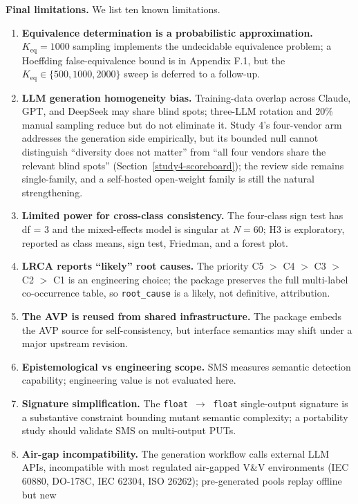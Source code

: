 \documentclass[manuscript,screen,review]{acmart}
\begin{document}
\textbf{Final limitations.} We list ten known limitations.

\begin{enumerate}
\item
  \textbf{Equivalence determination is a probabilistic approximation.}
  $K_{\mathrm{eq}} = 1000$ sampling implements the undecidable equivalence
  problem; a Hoeffding false-equivalence bound is in Appendix F.1, but the
  $K_{\mathrm{eq}} \in \{500, 1000, 2000\}$ sweep is deferred to a follow-up.
\item
  \textbf{LLM generation homogeneity bias.} Training-data overlap across Claude,
  GPT, and DeepSeek may share blind spots; three-LLM rotation and 20\% manual
  sampling reduce but do not eliminate it. Study 4's four-vendor arm
  addresses the generation side empirically, but its bounded null cannot
  distinguish ``diversity does not matter'' from ``all four vendors share the
  relevant blind spots'' (Section~\ref{study4-scoreboard}); the review side
  remains single-family, and a self-hosted open-weight family is still the
  natural strengthening.
\item
  \textbf{Limited power for cross-class consistency.} The four-class sign test
  has df = 3 and the mixed-effects model is singular at $N = 60$; H3 is
  exploratory, reported as class means, sign test, Friedman, and a forest plot.
\item
  \textbf{LRCA reports ``likely'' root causes.} The priority
  C5 $>$ C4 $>$ C3 $>$ C2 $>$ C1 is an engineering choice; the package preserves
  the full multi-label co-occurrence table, so \texttt{root\_cause} is a likely,
  not definitive, attribution.
\item
  \textbf{The AVP is reused from shared infrastructure.} The package embeds the
  AVP source for self-consistency, but interface semantics may shift under a
  major upstream revision.
\item
  \textbf{Epistemological vs engineering scope.} SMS measures semantic detection
  capability; engineering value is not evaluated here.
\item
  \textbf{Signature simplification.} The \texttt{float\ $\to$\ float}
  single-output signature is a substantive constraint bounding mutant semantic
  complexity; a portability study should validate SMS on multi-output PUTs.
\item
  \textbf{Air-gap incompatibility.} The generation workflow calls external LLM
  APIs, incompatible with most regulated air-gapped V\&V environments (IEC 60880,
  DO-178C, IEC 62304, ISO 26262); pre-generated pools replay offline but new

\end{enumerate}
\end{document}
